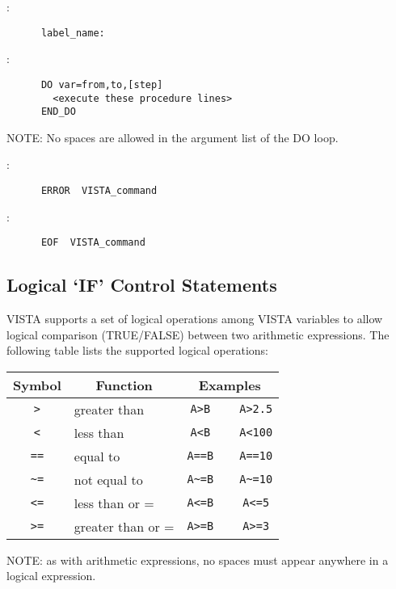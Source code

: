 \noindent {}:
\begin{verbatim}
      label_name:
\end{verbatim}

\noindent {}:
\begin{verbatim}
      DO var=from,to,[step]
	    <execute these procedure lines>
      END_DO
\end{verbatim}

\noindent NOTE:  No spaces are allowed in the argument list of the DO loop.

\noindent {}:
\begin{verbatim}
      ERROR  VISTA_command
\end{verbatim}

\noindent {}:
\begin{verbatim}
      EOF  VISTA_command
\end{verbatim}

\subsection{Logical `IF' Control Statements}

VISTA supports a set of logical operations among VISTA variables to allow
logical comparison (TRUE/FALSE) between two arithmetic expressions.  The
following table lists the supported logical operations:

\begin{center}
   \begin{tabular}{|c|l|ccc|} \hline
      Symbol&\multicolumn{1}{|c|}{Function}&
      \multicolumn{3}{c|}{Examples}\\ \hline
      \verb+>+&greater than&\verb+A>B+&&\verb+A>2.5+\\ \hline
      \verb+<+&less than&\verb+A<B+&&\verb+A<100+\\ \hline
      \verb+==+&equal to&\verb+A==B+&&\verb+A==10+\\ \hline
      \verb+~=+&not equal to&\verb+A~=B+&&\verb+A~=10+\\ \hline
      \verb+<=+&less than or =&\verb+A<=B+&&\verb+A<=5+\\ \hline
      \verb+>=+&greater than or =&\verb+A>=B+&&\verb+A>=3+\\ \hline
   \end{tabular}
\end{center}

\noindent NOTE: as with arithmetic expressions, no spaces must appear anywhere
in a logical expression.

